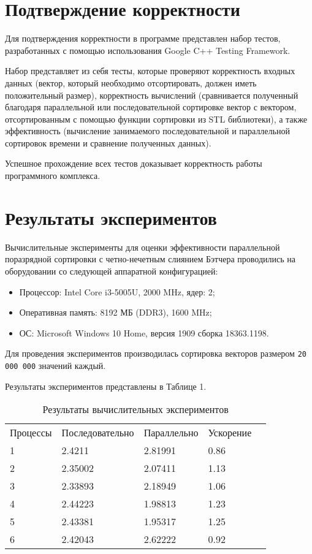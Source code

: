 \documentclass{report}
\begin{document}
\section*{Подтверждение корректности}
Для подтверждения корректности в программе представлен набор тестов, разработанных с помощью использования Google C++ Testing Framework.
\par Набор представляет из себя тесты, которые проверяют корректность входных данных (вектор, который необходимо отсортировать, должен иметь положительный размер), корректность вычислений (сравнивается полученный благодаря параллельной или последовательной сортировке вектор с вектором, отсортированным с помощью функции сортировки из STL библиотеки), а также эффективность (вычисление занимаемого последовательной и параллельной сортировок времени и сравнение полученных данных).
\par Успешное прохождение всех тестов доказывает корректность работы программного комплекса.
\newpage

\section*{Результаты экспериментов}
Вычислительные эксперименты для оценки эффективности параллельной поразрядной сортировки с четно-нечетным слиянием Бэтчера проводились на оборудовании со следующей аппаратной конфигурацией:

\begin{itemize}
\item Процессор: Intel Core i3-5005U, 2000 MHz, ядер: 2;
\item Оперативная память: 8192 МБ (DDR3), 1600 MHz;
\item ОС: Microsoft Windows 10 Home, версия 1909 сборка 18363.1198.
\end{itemize}

\par Для проведения экспериментов производилась сортировка векторов размером \verb|20 000 000| значений каждый. 
\par Результаты экспериментов представлены в Таблице 1.

\begin{table}[!h]
\caption{Результаты вычислительных экспериментов}
\centering
\begin{tabular}{lllll}
Процессы & Последовательно & Параллельно & Ускорение  \\
1        & 2.4211          & 2.81991     & 0.86       \\
2        & 2.35002         & 2.07411     & 1.13       \\
3        & 2.33893         & 2.18949     & 1.06       \\
4        & 2.44223         & 1.98813     & 1.23       \\
5        & 2.43381         & 1.95317     & 1.25       \\
6        & 2.42043         & 2.62222     & 0.92
\end{tabular}
\end{table}
\end{document}
